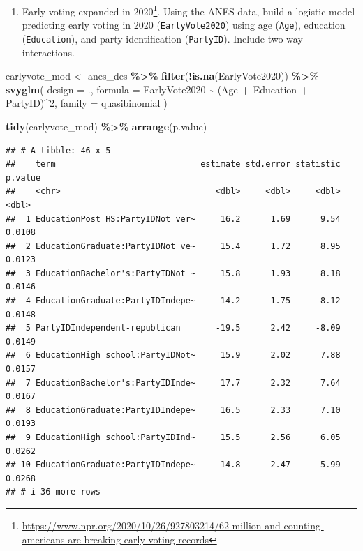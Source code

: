 \documentclass[
]{krantz}
\makeatletter
\newenvironment{Shaded}{\begin{snugshade}}{\end{snugshade}}
\newcommand{\AttributeTok}[1]{\textcolor[rgb]{0.27,0.27,0.27}{#1}}
\newcommand{\DecValTok}[1]{\textcolor[rgb]{0.06,0.06,0.06}{#1}}
\newcommand{\FunctionTok}[1]{\textcolor[rgb]{0.27,0.27,0.27}{\textbf{#1}}}
\newcommand{\NormalTok}[1]{#1}
\newcommand{\OtherTok}[1]{\textcolor[rgb]{0.37,0.37,0.37}{#1}}
\newcommand{\SpecialCharTok}[1]{\textcolor[rgb]{0.43,0.43,0.43}{\textbf{#1}}}
\providecommand{\tightlist}{%
  \setlength{\itemsep}{0pt}\setlength{\parskip}{0pt}}
\newenvironment{kframe}{%
\medskip{}
\setlength{\fboxsep}{.8em}
 \def\at@end@of@kframe{}%
 \ifinner\ifhmode%
  \def\at@end@of@kframe{\end{minipage}}%
  \begin{minipage}{\columnwidth}%
 \fi\fi%
 \def\FrameCommand##1{\hskip\@totalleftmargin \hskip-\fboxsep
 \colorbox{shadecolor}{##1}\hskip-\fboxsep
     \hskip-\linewidth \hskip-\@totalleftmargin \hskip\columnwidth}%
 \MakeFramed {\advance\hsize-\width
   \@totalleftmargin\z@ \linewidth\hsize
   \@setminipage}}%
 {\par\unskip\endMakeFramed%
 \at@end@of@kframe}
\renewenvironment{Shaded}{\begin{kframe}}{\end{kframe}}
\makeatother
\begin{document}
\begin{enumerate}
\def\labelenumi{\arabic{enumi}.}
\setcounter{enumi}{3}
\tightlist
\item
  Early voting expanded in 2020\footnote{\url{https://www.npr.org/2020/10/26/927803214/62-million-and-counting-americans-are-breaking-early-voting-records}}. Using the ANES data, build a logistic model predicting early voting in 2020 (\texttt{EarlyVote2020}) using age (\texttt{Age}), education (\texttt{Education}), and party identification (\texttt{PartyID}). Include two-way interactions.
\end{enumerate}

\begin{Shaded}
\begin{Highlighting}[]
\NormalTok{earlyvote\_mod }\OtherTok{\textless{}{-}}\NormalTok{ anes\_des }\SpecialCharTok{\%\textgreater{}\%}
  \FunctionTok{filter}\NormalTok{(}\SpecialCharTok{!}\FunctionTok{is.na}\NormalTok{(EarlyVote2020)) }\SpecialCharTok{\%\textgreater{}\%}
  \FunctionTok{svyglm}\NormalTok{(}
    \AttributeTok{design =}\NormalTok{ .,}
    \AttributeTok{formula =}\NormalTok{ EarlyVote2020 }\SpecialCharTok{\textasciitilde{}}\NormalTok{ (Age }\SpecialCharTok{+}\NormalTok{ Education }\SpecialCharTok{+}\NormalTok{ PartyID)}\SpecialCharTok{\^{}}\DecValTok{2}\NormalTok{,}
    \AttributeTok{family =}\NormalTok{ quasibinomial}
\NormalTok{  )}

\FunctionTok{tidy}\NormalTok{(earlyvote\_mod) }\SpecialCharTok{\%\textgreater{}\%} \FunctionTok{arrange}\NormalTok{(p.value)}
\end{Highlighting}
\end{Shaded}

\begin{verbatim}
## # A tibble: 46 x 5
##    term                             estimate std.error statistic p.value
##    <chr>                               <dbl>     <dbl>     <dbl>   <dbl>
##  1 EducationPost HS:PartyIDNot ver~     16.2      1.69      9.54  0.0108
##  2 EducationGraduate:PartyIDNot ve~     15.4      1.72      8.95  0.0123
##  3 EducationBachelor's:PartyIDNot ~     15.8      1.93      8.18  0.0146
##  4 EducationGraduate:PartyIDIndepe~    -14.2      1.75     -8.12  0.0148
##  5 PartyIDIndependent-republican       -19.5      2.42     -8.09  0.0149
##  6 EducationHigh school:PartyIDNot~     15.9      2.02      7.88  0.0157
##  7 EducationBachelor's:PartyIDInde~     17.7      2.32      7.64  0.0167
##  8 EducationGraduate:PartyIDIndepe~     16.5      2.33      7.10  0.0193
##  9 EducationHigh school:PartyIDInd~     15.5      2.56      6.05  0.0262
## 10 EducationGraduate:PartyIDIndepe~    -14.8      2.47     -5.99  0.0268
## # i 36 more rows
\end{verbatim}
\end{document}
